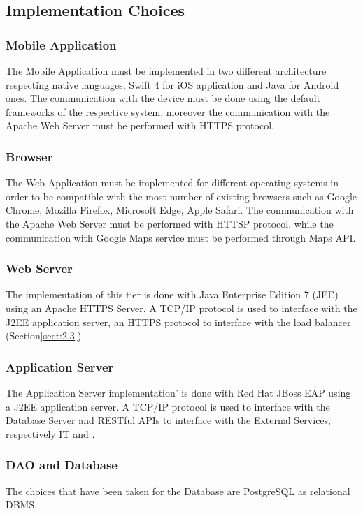 \documentclass[../DD.tex]{subfiles}
\begin{document}
\subsection{Implementation Choices\label{5.2.2}}

\subsubsection{Mobile Application}
The Mobile Application must be implemented in two different architecture respecting native languages, Swift 4 for iOS application and Java for Android ones. The communication with the device must be done using the default frameworks of the respective system, moreover the communication with the Apache Web Server must be performed with HTTPS protocol.

\subsubsection{Browser}
The Web Application must be implemented for different operating systems in order to be compatible with the most number of existing browsers such as Google Chrome, Mozilla Firefox, Microsoft Edge, Apple Safari. The communication with the Apache Web Server must be performed with HTTSP protocol, while the communication with Google Maps service must be performed through Maps API.

\subsubsection{Web Server}
The implementation of this tier is done with Java Enterprise Edition 7 (JEE) using an Apache HTTPS Server. A TCP/IP protocol is used to interface with the J2EE application server, an HTTPS protocol to interface with the load balancer (Section\ref{sect:2.3}). 

\subsubsection{Application Server}
The Application Server implementation' is done with Red Hat JBoss EAP using a J2EE application server. A TCP/IP protocol is used to interface with the Database Server and RESTful APIs to interface with the External Services, respectively  IT and  .

\subsubsection{DAO and Database}
The choices that have been taken for the Database are PostgreSQL as relational DBMS. 
\end{document}
